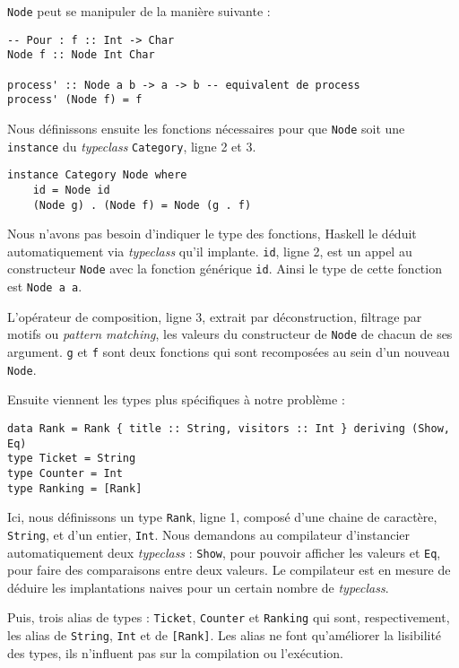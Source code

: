 \documentclass{llncs}
\begin{document}
\lstinline{Node} peut se manipuler de la manière suivante :
\begin{lstlisting}
-- Pour : f :: Int -> Char
Node f :: Node Int Char

process' :: Node a b -> a -> b -- equivalent de process
process' (Node f) = f
\end{lstlisting}

Nous définissons ensuite les fonctions nécessaires pour que \lstinline{Node} soit
une \lstinline{instance} du \emph{typeclass} \lstinline{Category}, ligne 2 et 3.

\begin{lstlisting}
instance Category Node where
    id = Node id
    (Node g) . (Node f) = Node (g . f)
\end{lstlisting}

Nous n'avons pas besoin d'indiquer le type des fonctions, Haskell le déduit automatiquement
via \emph{typeclass} qu'il implante.
\lstinline{id}, ligne 2, est un appel au constructeur \lstinline{Node} avec la
fonction générique \lstinline{id}.
Ainsi le type de cette fonction est \lstinline{Node a a}.

L'opérateur de composition, ligne 3, extrait par déconstruction, filtrage par motifs
ou \emph{pattern matching}, les valeurs du constructeur de \lstinline{Node} de chacun de ses argument.
\lstinline{g} et \lstinline{f} sont deux fonctions qui sont recomposées au sein
d'un nouveau \lstinline{Node}.

Ensuite viennent les types plus spécifiques à notre problème :

\begin{lstlisting}
data Rank = Rank { title :: String, visitors :: Int } deriving (Show, Eq)
type Ticket = String
type Counter = Int
type Ranking = [Rank]
\end{lstlisting}

Ici, nous définissons un type \lstinline{Rank}, ligne 1,
composé d'une chaine de caractère, \lstinline{String}, et d'un entier, \lstinline{Int}.
Nous demandons au compilateur d'instancier automatiquement deux \emph{typeclass} :
\lstinline{Show}, pour pouvoir afficher les valeurs et \lstinline{Eq},
pour faire des comparaisons entre deux valeurs.
Le compilateur est en mesure de déduire les implantations naives pour un certain
nombre de \emph{typeclass}.

Puis, trois alias de types : \lstinline{Ticket}, \lstinline{Counter} et
\lstinline{Ranking} qui sont, respectivement, les alias de \lstinline{String},
\lstinline{Int} et de \lstinline{[Rank]}.
Les alias ne font qu'améliorer la lisibilité des types, ils n'influent pas sur
la compilation ou l'exécution.
\end{document}
